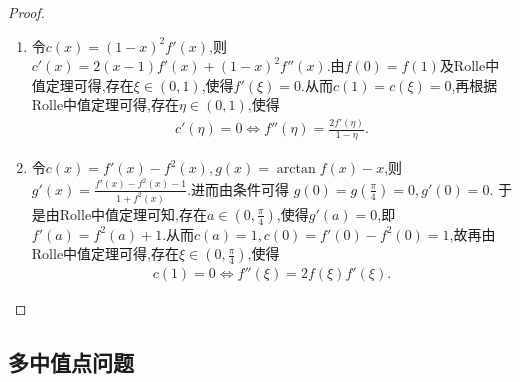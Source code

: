 \documentclass[../../main.tex]{subfiles}
\begin{document}
\begin{proof}
\begin{enumerate}
\item 令\(c(x)=(1 - x)^2f'(x)\),则\(c'(x)=2(x - 1)f'(x)+(1 - x)^2f''(x)\).由\(f(0)=f(1)\)及Rolle中值定理可得,存在\(\xi\in(0,1)\),使得\(f'(\xi)=0\).从而\(c(1)=c(\xi)=0\),再根据Rolle中值定理可得,存在\(\eta\in(0,1)\),使得
\begin{align*}
c'(\eta)=0\Leftrightarrow f''(\eta)=\frac{2f'(\eta)}{1 - \eta}.
\end{align*} 

\item 令\(c(x)=f'(x)-f^{2}(x),g(x)=\arctan f(x)-x\),则\(g'(x)=\frac{f'(x)-f^{2}(x)-1}{1 + f^{2}(x)}\).进而由条件可得
\(g(0)=g(\frac{\pi}{4}) = 0,g'(0)=0\).
于是由Rolle中值定理可知,存在\(a\in(0,\frac{\pi}{4})\),使得\(g'(a)=0\),即\(f'(a)=f^{2}(a)+1\).从而\(c(a)=1,c(0)=f'(0)-f^{2}(0)=1\),故再由Rolle中值定理可得,存在\(\xi\in(0,\frac{\pi}{4})\),使得
\begin{align*}
c(1)=0\Leftrightarrow f''(\xi)=2f(\xi)f'(\xi).
\end{align*} 
\end{enumerate}
\end{proof}

\subsection{多中值点问题}
\end{document}
